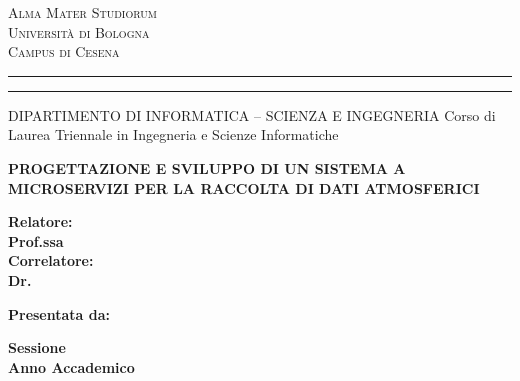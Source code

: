 
\oddsidemargin=25pt

\begin{titlepage}
\begin{center}
{
	{\Large{\textsc{Alma Mater Studiorum}}}\\
	{\Large{\textsc{Universit\`a di Bologna}}} \\
	{\textsc{Campus di Cesena}}
	\rule[0.1cm]{14cm}{0.1mm}
	\rule[0.5cm]{14cm}{0.6mm}
	DIPARTIMENTO DI INFORMATICA – SCIENZA E INGEGNERIA
	Corso di Laurea Triennale in Ingegneria e Scienze Informatiche
}
\end{center}
\vspace{15mm}
\begin{center}
{\LARGE{\bf PROGETTAZIONE E SVILUPPO DI UN SISTEMA A MICROSERVIZI PER LA RACCOLTA DI DATI ATMOSFERICI}}
\end{center}
\vspace{40mm}
\par
\noindent
\begin{minipage}[t]{0.47\textwidth}
{\large{\bf Relatore:\\Prof.ssa \xsupervisor}}
\vspace{5mm}
{\large{\bf \\Correlatore:\\Dr. \xcorrelatore}}
\end{minipage}
\hfill
\begin{minipage}[t]{0.47\textwidth}\raggedleft
{\large{\bf Presentata da:\\\xstudent}}
\end{minipage}
\vspace{20mm}
\begin{center}
{\large{\bf Sessione \xsession\\Anno Accademico \xaccademicyear}}
\end{center}
\end{titlepage}